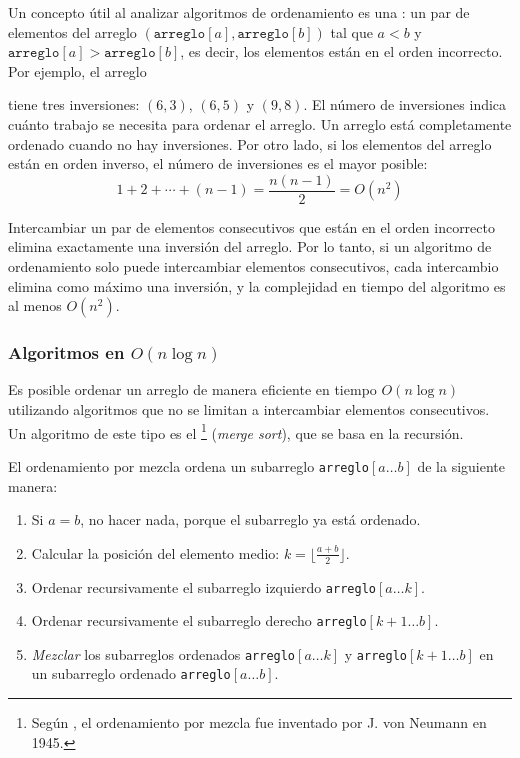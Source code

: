 \pagebreak Un concepto útil al analizar algoritmos de ordenamiento
es una :
un par de elementos del arreglo
$(\texttt{arreglo}[a], \texttt{arreglo}[b])$ tal que
$a<b$ y $\texttt{arreglo}[a]>\texttt{arreglo}[b]$,
es decir, los elementos están en el orden incorrecto.
Por ejemplo, el arreglo
\begin{center}
\end{center}
tiene tres inversiones: $(6,3)$, $(6,5)$ y $(9,8)$.
El número de inversiones indica
cuánto trabajo se necesita para ordenar el arreglo.
Un arreglo está completamente ordenado cuando
no hay inversiones.
Por otro lado, si los elementos del arreglo
están en orden inverso,
el número de inversiones es el mayor posible:
\[1+2+\cdots+(n-1)=\frac{n(n-1)}{2} = O(n^2)\]

Intercambiar un par de elementos consecutivos que están
en el orden incorrecto elimina exactamente una inversión
del arreglo.
Por lo tanto, si un algoritmo de ordenamiento solo puede
intercambiar elementos consecutivos, cada intercambio elimina
como máximo una inversión, y la complejidad en tiempo
del algoritmo es al menos $O(n^2)$.

\subsubsection{Algoritmos en $O(n \log n)$}


Es posible ordenar un arreglo de manera eficiente
en tiempo $O(n \log n)$ utilizando algoritmos
que no se limitan a intercambiar elementos consecutivos.
Un algoritmo de este tipo es el 
\footnote{Según \cite{knu983}, el ordenamiento por mezcla fue
    inventado por J. von Neumann en 1945.} (\textit{merge sort}),
que se basa en la recursión.

El ordenamiento por mezcla ordena un subarreglo
\texttt{arreglo}$[a \ldots b]$ de la siguiente manera:

\begin{enumerate}
    \item Si $a=b$, no hacer nada, porque el subarreglo ya está ordenado.
    \item Calcular la posición del elemento medio: $k=\lfloor \frac{a+b}{2} \rfloor$.
    \item Ordenar recursivamente el subarreglo izquierdo \texttt{arreglo}$[a \ldots k]$.
    \item Ordenar recursivamente el subarreglo derecho \texttt{arreglo}$[k+1 \ldots b]$.
    \item \emph{Mezclar} los subarreglos ordenados \texttt{arreglo}$[a \ldots k]$ y
          \texttt{arreglo}$[k+1 \ldots b]$ en un subarreglo ordenado
          \texttt{arreglo}$[a \ldots b]$.
\end{enumerate}

